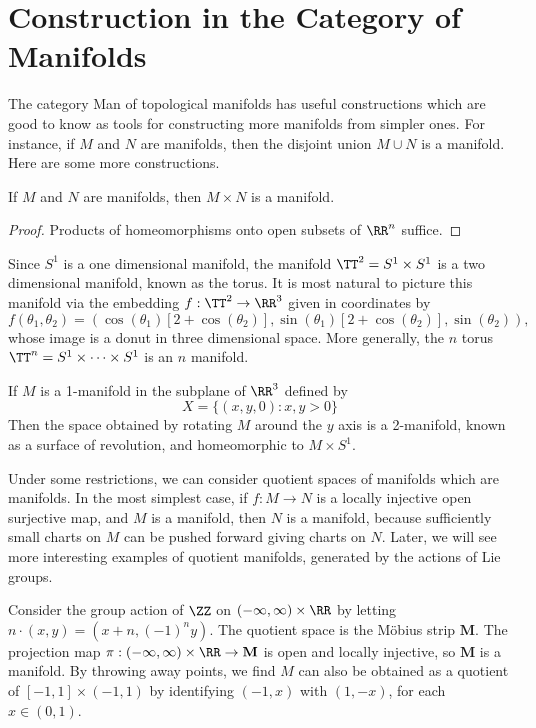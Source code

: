 \section{Construction in the Category of Manifolds}

The category {\sf Man} of topological manifolds has useful constructions which are good to know as tools for constructing more manifolds from simpler ones. For instance, if $M$ and $N$ are manifolds, then the disjoint union $M \cup N$ is a manifold. Here are some more constructions.

\begin{theorem}
    If $M$ and $N$ are manifolds, then $M \times N$ is a manifold.
\end{theorem}
\begin{proof}
    Products of homeomorphisms onto open subsets of $\RR^n$ suffice.
\end{proof}

\begin{example}
    Since $S^1$ is a one dimensional manifold, the manifold $\TT^2 = S^1 \times S^1$ is a two dimensional manifold, known as the torus. It is most natural to picture this manifold via the embedding $f: \TT^2 \to \RR^3$ given in coordinates by
    \[ f(\theta_1,\theta_2) = (\cos(\theta_1) [2 + \cos(\theta_2)],\sin(\theta_1) [2 + \cos(\theta_2)], \sin(\theta_2)), \]
    whose image is a donut in three dimensional space. More generally, the $n$ torus $\TT^n = S^1 \times \dots \times S^1$ is an $n$ manifold.
\end{example}

\begin{example}
    If $M$ is a 1-manifold in the subplane of $\RR^3$ defined by
    \[ X = \{ (x,y,0): x,y > 0 \} \]
    Then the space obtained by rotating $M$ around the $y$ axis is a 2-manifold, known as a surface of revolution, and homeomorphic to $M \times S^1$.
\end{example}

Under some restrictions, we can consider quotient spaces of manifolds which are manifolds. In the most simplest case, if $f: M \to N$ is a locally injective open surjective map, and $M$ is a manifold, then $N$ is a manifold, because sufficiently small charts on $M$ can be pushed forward giving charts on $N$. Later, we will see more interesting examples of quotient manifolds, generated by the actions of Lie groups.

\begin{example}
    Consider the group action of $\ZZ$ on $(-\infty,\infty) \times \RR$ by letting $n \cdot (x,y) = (x + n, (-1)^n y)$. The quotient space is the M\"{o}bius strip $\mathbf{M}$. The projection map $\pi: (-\infty,\infty) \times \RR \to \mathbf{M}$ is open and locally injective, so $\mathbf{M}$ is a manifold. By throwing away points, we find $M$ can also be obtained as a quotient of $[-1,1] \times (-1,1)$ by identifying $(-1,x)$ with $(1,-x)$, for each $x \in (0,1)$.
\end{example}

